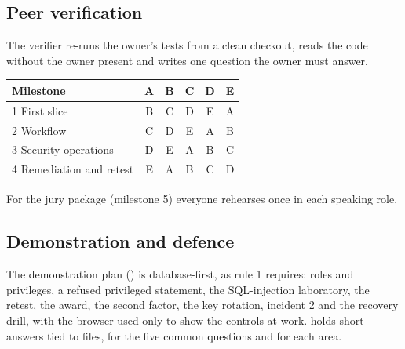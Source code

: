 \subsection*{Peer verification}
The verifier re-runs the owner's tests from a clean checkout, reads the code without the owner present and writes one question the owner must answer.
\begin{center}\small
\begin{tabular}{@{}lccccc@{}}
\toprule\textbf{Milestone} & \textbf{A} & \textbf{B} & \textbf{C} & \textbf{D} & \textbf{E}\\\midrule
1 First slice & B & C & D & E & A\\
2 Workflow & C & D & E & A & B\\
3 Security operations & D & E & A & B & C\\
4 Remediation and retest & E & A & B & C & D\\
\bottomrule\end{tabular}\end{center}
For the jury package (milestone 5) everyone rehearses  once in each speaking role.
\subsection*{Demonstration and defence}
The demonstration plan () is database-first, as rule 1 requires: roles and privileges, a refused privileged statement, the SQL-injection laboratory, the retest, the award, the second factor, the key rotation, incident 2 and the recovery drill, with the browser used only to show the controls at work.  holds short answers tied to files, for the five common questions and for each area.
